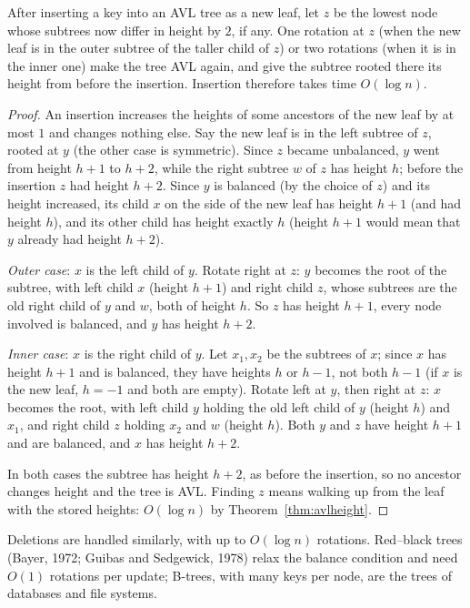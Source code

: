 \begin{theorem}\label{thm:avlinsert}
After inserting a key into an AVL tree as a new leaf, let $z$ be the lowest node whose subtrees now differ in height by $2$, if any. One rotation at $z$ (when
the new leaf is in the outer subtree of the taller child of $z$) or two rotations (when it is in the inner one) make the tree AVL again, and give the subtree
rooted there its height from before the insertion. Insertion therefore takes time $O(\log n)$.
\end{theorem}
\begin{proof}
An insertion increases the heights of some ancestors of the new leaf by at most $1$ and changes nothing else. Say the new leaf is in the left subtree of $z$,
rooted at $y$ (the other case is symmetric). Since $z$ became unbalanced, $y$ went from height $h+1$ to $h+2$, while the right subtree $w$ of $z$ has height
$h$; before the insertion $z$ had height $h+2$. Since $y$ is balanced (by the choice of $z$) and its height increased, its child $x$ on the side of the new leaf has
height $h+1$ (and had height $h$), and its other child has height exactly $h$ (height $h+1$ would mean that $y$ already had height $h+2$).

\emph{Outer case}: $x$ is the left child of $y$. Rotate right at $z$: $y$ becomes the root of the subtree, with left child $x$ (height $h+1$) and right child $z$, whose
subtrees are the old right child of $y$ and $w$, both of height $h$. So $z$ has height $h+1$, every node involved is balanced, and $y$ has height $h+2$.

\emph{Inner case}: $x$ is the right child of $y$. Let $x_1,x_2$ be the subtrees of $x$; since $x$ has height $h+1$ and is balanced, they have heights $h$ or $h-1$, not both
$h-1$ (if $x$ is the new leaf, $h=-1$ and both are empty). Rotate left at $y$, then right at $z$: $x$ becomes the root, with left child $y$ holding the old left
child of $y$ (height $h$) and $x_1$, and right child $z$ holding $x_2$ and $w$ (height $h$). Both $y$ and $z$ have height $h+1$ and are balanced, and $x$ has height $h+2$.

In both cases the subtree has height $h+2$, as before the insertion, so no ancestor changes height and the tree is AVL. Finding $z$ means walking up from the leaf
with the stored heights: $O(\log n)$ by Theorem~\ref{thm:avlheight}.
\end{proof}

Deletions are handled similarly, with up to $O(\log n)$ rotations. Red--black trees (Bayer, 1972; Guibas and Sedgewick, 1978) relax the balance condition and
need $O(1)$ rotations per update; B-trees, with many keys per node, are the trees of databases and file systems.

